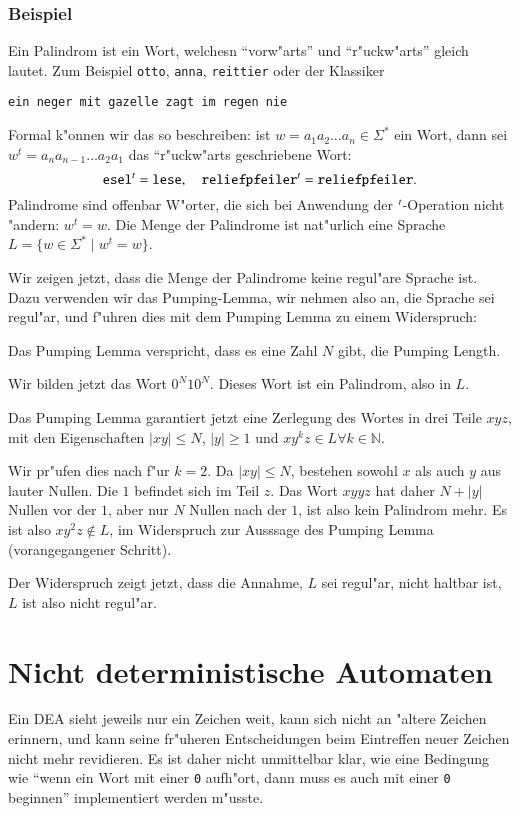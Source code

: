 \subsubsection{Beispiel}
Ein Palindrom ist ein Wort, welchesn ``vorw"arts'' und ``r"uckw"arts''
gleich lautet. Zum Beispiel {\tt otto}, {\tt anna}, {\tt reittier} oder der
Klassiker
\begin{center}
{\tt ein neger mit gazelle zagt im regen nie}
\end{center}
Formal k"onnen wir das so beschreiben: ist $w=a_1a_2\dots a_n\in\Sigma^*$
ein Wort, dann sei $w^t=a_na_{n-1}\dots a_2a_1$ das ``r"uckw"arts
geschriebene Wort:
\[
{\tt esel}^t={\tt lese},\quad {\tt reliefpfeiler}^t={\tt reliefpfeiler}.
\]
Palindrome sind offenbar W"orter, die sich bei Anwendung der
$\mathstrut^t$-Operation nicht "andern: $w^t=w$. Die Menge der Palindrome
ist nat"urlich eine Sprache $L=\{w\in\Sigma^*\;|\;w^t=w\}$. 

Wir zeigen jetzt, dass die Menge der Palindrome keine regul"are Sprache ist.
Dazu verwenden wir das Pumping-Lemma, wir nehmen also an, die Sprache
sei regul"ar, und f"uhren dies mit dem Pumping Lemma zu einem
Widerspruch:
\begin{compactenum}
\item Das Pumping Lemma verspricht, dass es eine Zahl $N$ gibt, die
Pumping Length.
\item Wir bilden jetzt das Wort $0^N10^N$. Dieses Wort ist ein Palindrom,
also in $L$.
\item Das Pumping Lemma garantiert jetzt eine Zerlegung des Wortes
in drei Teile $xyz$, mit den Eigenschaften $|xy|\le N$, $|y|\ge 1$ und
$xy^kz\in L\forall k\in\mathbb N$.
\item Wir pr"ufen dies nach f"ur $k=2$. Da $|xy|\le N$, bestehen
sowohl $x$ als auch $y$ aus lauter Nullen. Die $1$ befindet sich im Teil $z$.
Das Wort $xyyz$ hat daher $N+|y|$ Nullen vor der $1$, aber nur $N$ Nullen
nach der $1$, ist also kein Palindrom mehr. Es ist also $xy^2z\not\in L$,
im Widerspruch zur Ausssage des Pumping Lemma (vorangegangener Schritt).
\end{compactenum}
Der Widerspruch zeigt jetzt, dass die Annahme, $L$ sei regul"ar, nicht
haltbar ist, $L$ ist also nicht regul"ar.

\section{Nicht deterministische Automaten\label{regulaer:nea}}
Ein DEA sieht jeweils nur ein Zeichen weit, kann sich nicht an "altere
Zeichen erinnern, und kann seine fr"uheren Entscheidungen beim Eintreffen
neuer Zeichen nicht mehr revidieren. Es ist daher nicht unmittelbar klar,
wie eine Bedingung wie ``wenn ein
Wort mit einer {\tt 0} aufh"ort, dann muss es auch mit einer {\tt 0}
beginnen'' implementiert werden m"usste.


